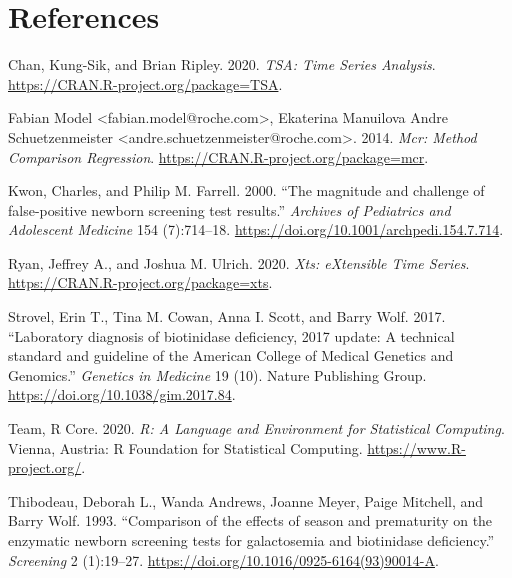 \documentclass[review]{elsarticle}
\begin{document}
\section*{References}
\label{sec:orgd4f6b0e}
\begin{hangparas}{1.5em}{1}
\hypertarget{citeproc_bib_item_1}{Chan, Kung-Sik, and Brian Ripley. 2020. \textit{TSA: Time Series Analysis}. \href{https://CRAN.R-project.org/package=TSA}{https://CRAN.R-project.org/package=TSA}.}

\hypertarget{citeproc_bib_item_2}{Fabian Model <fabian.model@roche.com>, Ekaterina Manuilova Andre Schuetzenmeister <andre.schuetzenmeister@roche.com>. 2014. \textit{Mcr: Method Comparison Regression}. \href{https://CRAN.R-project.org/package=mcr}{https://CRAN.R-project.org/package=mcr}.}

\hypertarget{citeproc_bib_item_3}{Kwon, Charles, and Philip M. Farrell. 2000. “The magnitude and challenge of false-positive newborn screening test results.” \textit{Archives of Pediatrics and Adolescent Medicine} 154 (7):714–18. \href{https://doi.org/10.1001/archpedi.154.7.714}{https://doi.org/10.1001/archpedi.154.7.714}.}

\hypertarget{citeproc_bib_item_4}{Ryan, Jeffrey A., and Joshua M. Ulrich. 2020. \textit{Xts: eXtensible Time Series}. \href{https://CRAN.R-project.org/package=xts}{https://CRAN.R-project.org/package=xts}.}

\hypertarget{citeproc_bib_item_5}{Strovel, Erin T., Tina M. Cowan, Anna I. Scott, and Barry Wolf. 2017. “Laboratory diagnosis of biotinidase deficiency, 2017 update: A technical standard and guideline of the American College of Medical Genetics and Genomics.” \textit{Genetics in Medicine} 19 (10). Nature Publishing Group. \href{https://doi.org/10.1038/gim.2017.84}{https://doi.org/10.1038/gim.2017.84}.}

\hypertarget{citeproc_bib_item_6}{Team, R Core. 2020. \textit{R: A Language and Environment for Statistical Computing}. Vienna, Austria: R Foundation for Statistical Computing. \href{https://www.R-project.org/}{https://www.R-project.org/}.}

\hypertarget{citeproc_bib_item_7}{Thibodeau, Deborah L., Wanda Andrews, Joanne Meyer, Paige Mitchell, and Barry Wolf. 1993. “Comparison of the effects of season and prematurity on the enzymatic newborn screening tests for galactosemia and biotinidase deficiency.” \textit{Screening} 2 (1):19–27. \href{https://doi.org/10.1016/0925-6164(93)90014-A}{https://doi.org/10.1016/0925-6164(93)90014-A}.}


\end{hangparas}
\end{document}
